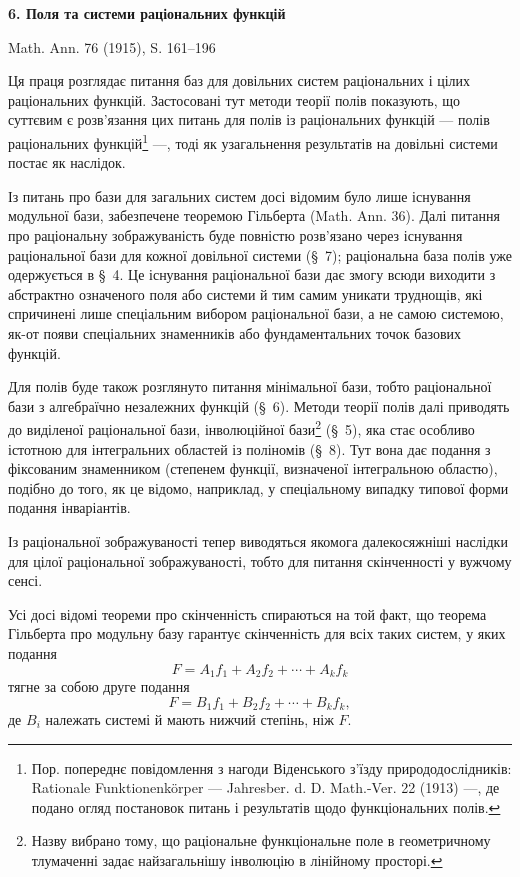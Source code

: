 \documentclass[11pt]{article}
\begin{document}
\begin{center}
{\Large\bfseries 6. Поля та системи раціональних функцій}\par
\vspace{1.2em}
Math. Ann. 76 (1915), S. 161--196
\end{center}

\vspace{2em}

Ця праця розглядає питання баз для довільних систем раціональних і цілих раціональних функцій. Застосовані тут методи теорії полів показують, що суттєвим є розв'язання цих питань для полів із раціональних функцій --- полів раціональних функцій\footnote{Пор. попереднє повідомлення з нагоди Віденського з'їзду природодослідників: Rationale Funktionenkörper --- Jahresber. d. D. Math.-Ver. 22 (1913) ---, де подано огляд постановок питань і результатів щодо функціональних полів.} ---, тоді як узагальнення результатів на довільні системи постає як наслідок.

Із питань про бази для загальних систем досі відомим було лише існування модульної бази, забезпечене теоремою Гільберта (Math. Ann. 36). Далі питання про раціональну зображуваність буде повністю розв'язано через існування раціональної бази для кожної довільної системи (\S\ 7); раціональна база полів уже одержується в \S\ 4. Це існування раціональної бази дає змогу всюди виходити з абстрактно означеного поля або системи й тим самим уникати труднощів, які спричинені лише спеціальним вибором раціональної бази, а не самою системою, як-от появи спеціальних знаменників або фундаментальних точок базових функцій.

Для полів буде також розглянуто питання мінімальної бази, тобто раціональної бази з алгебраїчно незалежних функцій (\S\ 6). Методи теорії полів далі приводять до виділеної раціональної бази, інволюційної бази\footnote{Назву вибрано тому, що раціональне функціональне поле в геометричному тлумаченні задає найзагальнішу інволюцію в лінійному просторі.} (\S\ 5), яка стає особливо істотною для інтегральних областей із поліномів (\S\ 8). Тут вона дає подання з фіксованим знаменником (степенем функції, визначеної інтегральною областю), подібно до того, як це відомо, наприклад, у спеціальному випадку типової форми подання інваріантів.

Із раціональної зображуваності тепер виводяться якомога далекосяжніші наслідки для цілої раціональної зображуваності, тобто для питання скінченності у вужчому сенсі.

Усі досі відомі теореми про скінченність спираються на той факт, що теорема Гільберта про модульну базу гарантує скінченність для всіх таких систем, у яких подання
\[
  F=A_1f_1+A_2f_2+\cdots+A_kf_k
\]
тягне за собою друге подання
\[
  F=B_1f_1+B_2f_2+\cdots+B_kf_k,
\]
де $B_i$ належать системі й мають нижчий степінь, ніж $F$.
\end{document}
